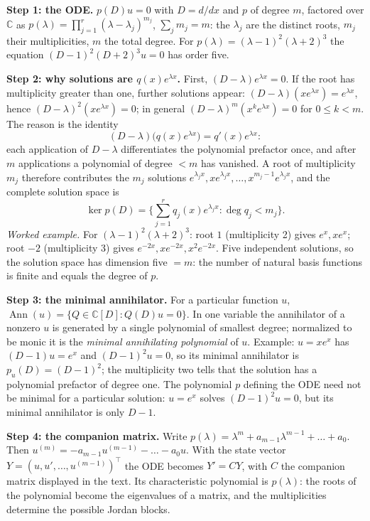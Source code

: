 \documentclass[11pt]{article}
\theoremstyle{plain}
\theoremstyle{definition}
\theoremstyle{remark}
\newcommand{\C}{\mathbb{C}}
\DeclareMathOperator{\Ann}{Ann}             %
\begin{document}
\medskip\textbf{Step 1: the ODE.} $p(D)u=0$ with $D=d/dx$ and $p$ of degree $m$, factored over $\C$ as $p(\lambda)=\prod_{j=1}^r(\lambda-\lambda_j)^{m_j}$, $\sum_jm_j=m$: the $\lambda_j$ are the distinct roots, $m_j$ their multiplicities, $m$ the total degree. For $p(\lambda)=(\lambda-1)^2(\lambda+2)^3$ the equation $(D-1)^2(D+2)^3u=0$ has order five.

\medskip\textbf{Step 2: why solutions are $q(x)e^{\lambda x}$.} First, $(D-\lambda)e^{\lambda x}=0$. If the root has multiplicity greater than one, further solutions appear: $(D-\lambda)(xe^{\lambda x})=e^{\lambda x}$, hence $(D-\lambda)^2(xe^{\lambda x})=0$; in general $(D-\lambda)^m(x^ke^{\lambda x})=0$ for $0\le k<m$. The reason is the identity
\[
(D-\lambda)\big(q(x)e^{\lambda x}\big)=q'(x)e^{\lambda x}:
\]
each application of $D-\lambda$ differentiates the polynomial prefactor once, and after $m$ applications a polynomial of degree $<m$ has vanished. A root of multiplicity $m_j$ therefore contributes the $m_j$ solutions $e^{\lambda_jx},xe^{\lambda_jx},\dots,x^{m_j-1}e^{\lambda_jx}$, and the complete solution space is
\[
\ker p(D)=\Big\{\sum_{j=1}^rq_j(x)e^{\lambda_jx}:\deg q_j<m_j\Big\}.
\]
\emph{Worked example.} For $(\lambda-1)^2(\lambda+2)^3$: root $1$ (multiplicity 2) gives $e^x,xe^x$; root $-2$ (multiplicity 3) gives $e^{-2x},xe^{-2x},x^2e^{-2x}$. Five independent solutions, so the solution space has dimension five $=m$: the number of natural basis functions is finite and equals the degree of $p$.

\medskip\textbf{Step 3: the minimal annihilator.} For a particular function $u$, $\Ann(u)=\{Q\in\C[D]:Q(D)u=0\}$. In one variable the annihilator of a nonzero $u$ is generated by a single polynomial of smallest degree; normalized to be monic it is the \emph{minimal annihilating polynomial} of $u$. Example: $u=xe^x$ has $(D-1)u=e^x$ and $(D-1)^2u=0$, so its minimal annihilator is $p_u(D)=(D-1)^2$; the multiplicity two tells that the solution has a polynomial prefactor of degree one. The polynomial $p$ defining the ODE need not be minimal for a particular solution: $u=e^x$ solves $(D-1)^2u=0$, but its minimal annihilator is only $D-1$.

\medskip\textbf{Step 4: the companion matrix.} Write $p(\lambda)=\lambda^m+a_{m-1}\lambda^{m-1}+\dots+a_0$. Then $u^{(m)}=-a_{m-1}u^{(m-1)}-\dots-a_0u$. With the state vector $Y=(u,u',\dots,u^{(m-1)})^\top$ the ODE becomes $Y'=CY$, with $C$ the companion matrix displayed in the text. Its characteristic polynomial is $p(\lambda)$: the roots of the polynomial become the eigenvalues of a matrix, and the multiplicities determine the possible Jordan blocks.
\end{document}
